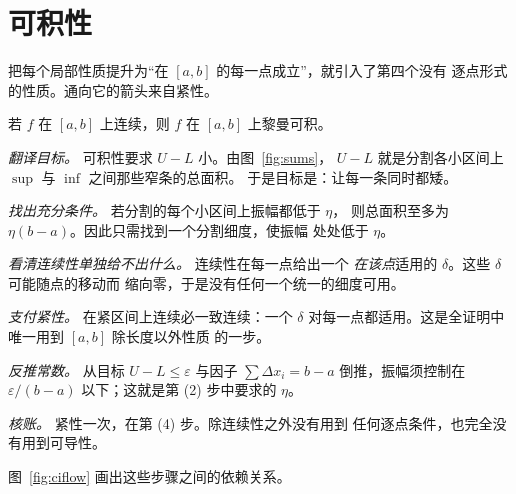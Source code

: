 \section{可积性}
\label{sec:int}

把每个局部性质提升为“在 $[a,b]$ 的每一点成立”，就引入了第四个没有
逐点形式的性质。通向它的箭头来自紧性。

\begin{theorem}\label{thm:ci}
若 $f$ 在 $[a,b]$ 上连续，则 $f$ 在 $[a,b]$ 上黎曼可积。
\end{theorem}

\begin{flow}[证明的脉络]
  \item \textit{翻译目标。} 可积性要求 $U-L$ 小。由图~\ref{fig:sums}，
        $U-L$ 就是分割各小区间上 $\sup$ 与 $\inf$ 之间那些窄条的总面积。
        于是目标是：让每一条同时都矮。
  \item \textit{找出充分条件。} 若分割的每个小区间上振幅都低于 $\eta$，
        则总面积至多为 $\eta(b-a)$。因此只需找到一个分割细度，使振幅
        处处低于 $\eta$。
  \item \textit{看清连续性单独给不出什么。} 连续性在每一点给出一个
        \emph{在该点}适用的 $\delta$。这些 $\delta$ 可能随点的移动而
        缩向零，于是没有任何一个统一的细度可用。
  \item \textit{支付紧性。} 在紧区间上连续必一致连续：一个 $\delta$
        对每一点都适用。这是全证明中唯一用到 $[a,b]$ 除长度以外性质
        的一步。
  \item \textit{反推常数。} 从目标 $U-L \le \varepsilon$ 与因子
        $\sum \Delta x_i = b-a$ 倒推，振幅须控制在 $\varepsilon/(b-a)$
        以下；这就是第 (2) 步中要求的 $\eta$。
  \item \textit{核账。} 紧性一次，在第 (4) 步。除连续性之外没有用到
        任何逐点条件，也完全没有用到可导性。
\end{flow}

图~\ref{fig:ciflow} 画出这些步骤之间的依赖关系。

